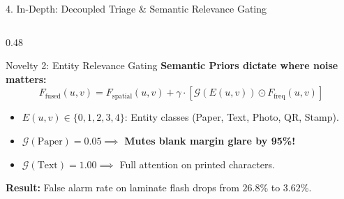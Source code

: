 \documentclass[aspectratio=169, 10pt]{beamer}
\begin{document}
\begin{frame}{4. In-Depth: Decoupled Triage \& Semantic Relevance Gating}
\begin{columns}[T]
    \begin{column}{0.48\textwidth}
      \begin{crispbox}{Novelty 2: Entity Relevance Gating}
        \textbf{Semantic Priors dictate where noise matters:}
        $$F_{\text{fused}}(u,v) = F_{\text{spatial}}(u,v) + \gamma \cdot \left[ \mathcal{G}(E(u,v)) \odot F_{\text{freq}}(u,v) \right]$$
        \begin{itemize}\scriptsize
          \item $E(u,v) \in \{0, 1, 2, 3, 4\}$: Entity classes (Paper, Text, Photo, QR, Stamp).
          \item $\mathcal{G}(\text{Paper}) = 0.05 \implies$ \textbf{Mutes blank margin glare by 95\%!}
          \item $\mathcal{G}(\text{Text}) = 1.00 \implies$ Full attention on printed characters.
        \end{itemize}
        \textbf{Result:} False alarm rate on laminate flash drops from $26.8\%$ to $\mathbf{3.62\%}$.
      \end{crispbox}
    \end{column}
  \end{columns}
\end{frame}
\end{document}
